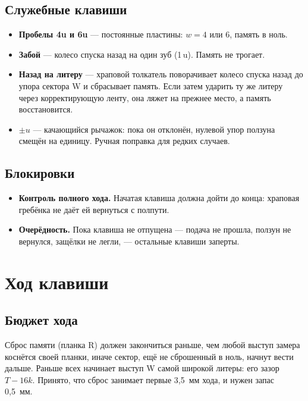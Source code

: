 \subsection{Служебные клавиши}

\begin{itemize}
  \item \textbf{Пробелы 4u и 6u} — постоянные пластины: $w = 4$ или $6$, память в ноль.
  \item \textbf{Забой} — колесо спуска назад на один зуб (1\,u). Память не трогает.
  \item \textbf{Назад на литеру} — храповой толкатель поворачивает колесо спуска назад до упора сектора W и сбрасывает память. Если затем ударить ту же литеру через корректирующую ленту, она ляжет на прежнее место, а память восстановится.
  \item \textbf{$\pm u$} — качающийся рычажок: пока он отклонён, нулевой упор ползуна смещён на единицу. Ручная поправка для редких случаев.
\end{itemize}

\subsection{Блокировки}

\begin{itemize}
  \item \textbf{Контроль полного хода.} Начатая клавиша должна дойти до конца: храповая гребёнка не даёт ей вернуться с полпути.
  \item \textbf{Очерёдность.} Пока клавиша не отпущена — подача не прошла, ползун не вернулся, защёлки не легли, — остальные клавиши заперты.
\end{itemize}

\section{Ход клавиши}
\label{sec:budget}

\subsection{Бюджет хода}

Сброс памяти (планка R) должен закончиться раньше, чем любой выступ замера коснётся своей планки, иначе сектор, ещё не сброшенный в ноль, начнут вести дальше. Раньше всех начинает выступ W самой широкой литеры: его зазор $T - 16k$. Принято, что сброс занимает первые 3,5~мм хода, и нужен запас 0,5~мм.

